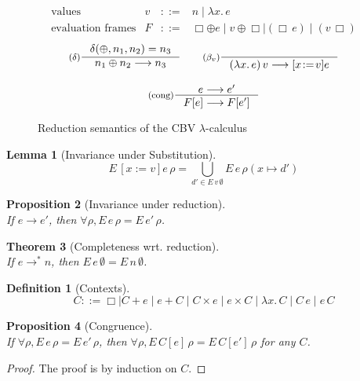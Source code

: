 \documentclass{tufte-handout}
\newcommand{\LAM}[1]{\lambda #1.\,}
\newcommand{\APP}[0]{\,}
\newcommand{\by}[0]{\!:=\!}
\newcommand{\ext}[3]{#3(#1{\mapsto}#2)}
\newtheorem{theorem}{Theorem}%
\newtheorem{lemma}[theorem]{Lemma}
\newtheorem{proposition}[theorem]{Proposition}
\newtheorem{definition}{Definition}%
\begin{document}
\begin{figure}[tbp]
\[
\begin{array}{lccl}
  \text{values} & v &::=& n \mid \LAM{x}e \\
  \text{evaluation frames} & F &::=& \Box \oplus e \mid v \oplus \Box \mid (\Box \APP e) 
     \mid (v \APP \Box)
\end{array}
\]
\begin{gather*}
  \inference[($\delta$)]{\delta(\oplus,n_1,n_2) = n_3}
            {n_1 \oplus n_2 \longrightarrow n_3} 
  \qquad
  \inference[($\beta_v$)]{}
            {(\LAM{x}e)\APP v \longrightarrow [x\by v]e} \\[2ex]
  \inference[(cong)]{e \longrightarrow e'}
                    {F[e] \longrightarrow F[e']}
\end{gather*}

\caption{Reduction semantics of the CBV $\lambda$-calculus}
\label{fig:lambda-reduce}
\end{figure}


\begin{lemma}[Invariance under Substitution]
\[
  E\,[x\by v]e\,\rho = \bigcup_{d' \in E\,v\,\emptyset} E\,e\,\ext{x}{d'}{\rho}
\]
\end{lemma}

\begin{proposition}[Invariance under reduction]\ \\
\noindent If $e \longrightarrow e'$, then $\forall \rho, E\,e\,\rho =
E\,e'\,\rho$.
\end{proposition}

\begin{theorem}[Completeness wrt. reduction]\label{thm:E-complete-reduction}\ \\
\noindent If $e \longrightarrow^{*} n$, then $E\,e\,\emptyset =
E\,n\,\emptyset$.
\end{theorem}

\begin{definition}[Contexts]
\[
  C ::= \Box \mid C + e \mid e + C \mid C \times e \mid e \times C \mid
       \LAM{x} C \mid C \APP e \mid e \APP C
\]
\end{definition}

\begin{proposition}[Congruence]\ \\
  \label{prop:congruence}
  If $\forall \rho, E\,e\,\rho = E\,e'\,\rho$, 
  then $\forall \rho, E\,C[e]\,\rho = E\,C[e']\,\rho$
  for any $C$.
\end{proposition}
\begin{proof}
  The proof is by induction on $C$.
\end{proof}
\end{document}
